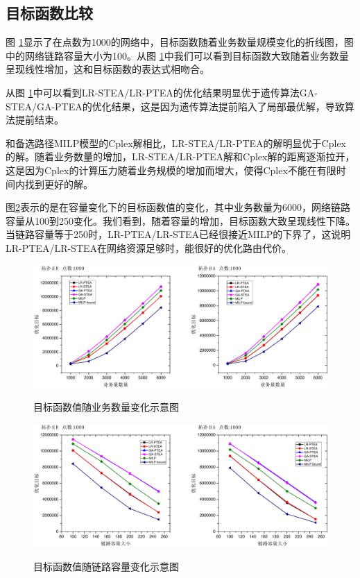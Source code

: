 \subsection{目标函数比较}
图 \ref{OB-TA}显示了在点数为1000的网络中，目标函数随着业务数量规模变化的折线图，图中的网络链路容量大小为100。从图 \ref{OB-TA}中我们可以看到目标函数大致随着业务数量呈现线性增加，这和目标函数的表达式相吻合。

从图 \ref{OB-TA}中可以看到LR-STEA/LR-PTEA的优化结果明显优于遗传算法GA-STEA/GA-PTEA的优化结果，这是因为遗传算法提前陷入了局部最优解，导致算法提前结束。

和备选路径MILP模型的Cplex解相比，LR-STEA/LR-PTEA的解明显优于Cplex的解。随着业务数量的增加，LR-STEA/LR-PTEA解和Cplex解的距离逐渐拉开，这是因为Cplex的计算压力随着业务规模的增加而增大，使得Cplex不能在有限时间内找到更好的解。

图\ref{OB-CA}表示的是在容量变化下的目标函数值的变化，其中业务数量为6000，网络链路容量从100到250变化。我们看到，随着容量的增加，目标函数大致呈现线性下降。当链路容量等于250时，LR-PTEA/LR-STEA已经很接近MILP的下界了，这说明LR-PTEA/LR-STEA在网络资源足够时，能很好的优化路由代价。
\vspace{0.8cm}
\begin{figure}
\setlength{\abovecaptionskip}{-0.5cm}
\begin{center}
{\includegraphics[width=0.8 \textwidth]{figures/OB-TA.pdf}}
\end{center}
\caption{{\footnotesize{目标函数值随业务数量变化示意图}}}
\label{OB-TA}
\end{figure}
\begin{figure}
\setlength{\abovecaptionskip}{-0.5cm}
\begin{center}
{\includegraphics[width=0.8 \textwidth]{figures/OB-CA.pdf}}
\end{center}
\caption{{\footnotesize{目标函数值随链路容量变化示意图}}}
\label{OB-CA}
\end{figure}

